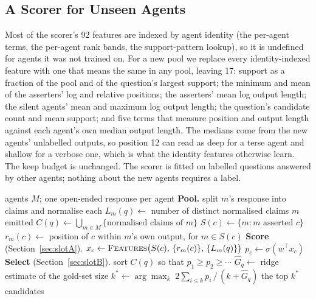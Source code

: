\documentclass[11pt]{article}
\begin{document}
\subsection{A Scorer for Unseen Agents}
\label{sec:invariant}

Most of the scorer's 92 features are indexed by agent identity (the per-agent terms, the
per-agent rank bands, the support-pattern lookup), so it is undefined for agents it was not
trained on. For a new pool we replace every identity-indexed feature with one that means the
same in any pool, leaving 17: support as a fraction of the pool and of the question's largest
support; the minimum and mean of the asserters' log and relative positions; the asserters'
mean log output length; the silent agents' mean and maximum log output length; the
question's candidate count and mean support; and five terms that measure position and output
length against each agent's own median output length. The medians come from the new agents'
unlabelled outputs, so position 12 can read as deep for a terse agent and shallow for a
verbose one, which is what the identity features otherwise learn. The keep budget is
unchanged. The scorer is fitted on labelled questions answered by other agents; nothing about
the new agents requires a label.


\begin{algorithm}[t]
\caption{Behavioural aggregation for one question $q$.}
\label{alg:beh}
\begin{algorithmic}[1]
\Require agents $M$; one open-ended response per agent
\Statex \textbf{Pool.}
  \State split $m$'s response into claims and normalise each
  \State $L_m(q) \gets$ number of distinct normalised claims $m$ emitted
\EndFor
\State $C(q) \gets \bigcup_{m \in M} \{\text{normalised claims of } m\}$
  \State $S(c) \gets \{m : m \text{ asserted } c\}$
  \State $r_m(c) \gets$ position of $c$ within $m$'s own output, for $m \in S(c)$
\EndFor
\Statex \textbf{Score} (Section~\ref{sec:slotA}).
  \State $x_c \gets \textsc{Features}\big(S(c),\, \{r_m(c)\},\, \{L_m(q)\}\big)$
  \State $p_c \gets \sigma(w^\top x_c)$ 
\EndFor
\Statex \textbf{Select} (Section~\ref{sec:slotB}).
\State sort $C(q)$ so that $p_1 \geq p_2 \geq \cdots$
\State $\hat{G}_q \gets$ ridge estimate of the gold-set size
\State $k^{*} \gets \arg\max_{k}\; 2\sum_{i \leq k} p_i \,/\, (k + \hat{G}_q)$
\State \Return the top $k^{*}$ candidates
\end{algorithmic}
\end{algorithm}
\end{document}
